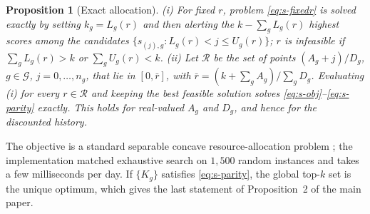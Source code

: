 \documentclass[10pt,onecolumn,letterpaper]{article}
\newtheorem{proposition}{Proposition}
\newcommand{\G}{\mathcal{G}}
\begin{document}
\begin{proposition}[Exact allocation]
\label{prop:s-greedy}
(i) For fixed $r$, problem \eqref{eq:s-fixedr} is solved exactly by setting $k_g=L_g(r)$ and then alerting the $k-\sum_gL_g(r)$ highest scores among the candidates $\{s_{(j),g}: L_g(r)<j\le U_g(r)\}$; $r$ is infeasible if $\sum_g L_g(r)>k$ or $\sum_g U_g(r)<k$. (ii) Let $\mathcal{R}$ be the set of points $(A_g+j)/D_g$, $g\in\G$, $j=0,\dots,n_g$, that lie in $[0,\bar r]$, with $\bar r=(k+\sum_gA_g)/\sum_gD_g$. Evaluating (i) for every $r\in\mathcal{R}$ and keeping the best feasible solution solves \eqref{eq:s-obj}--\eqref{eq:s-parity} exactly. This holds for real-valued $A_g$ and $D_g$, and hence for the discounted history.
\end{proposition}

The objective is a standard separable concave resource-allocation problem \cite{ibaraki1988resource}; the implementation matched exhaustive search on $1{,}500$ random instances and takes a few milliseconds per day. If $\{K_g\}$ satisfies \eqref{eq:s-parity}, the global top-$k$ set is the unique optimum, which gives the last statement of Proposition~2 of the main paper.
\end{document}
